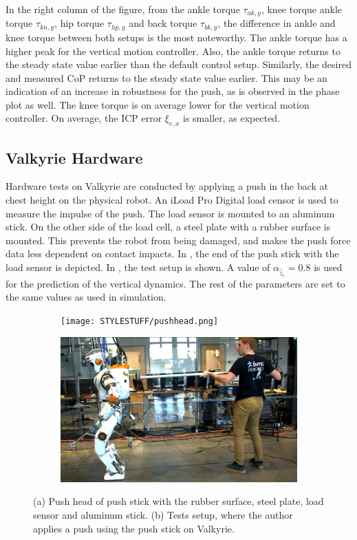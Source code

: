 In the right column of the figure, from the ankle torque $\tau_{ak,y}$, knee torque ankle torque $\tau_{kn,y}$, hip torque $\tau_{hp,y}$ and back torque $\tau_{bk,y}$, the difference in ankle and knee torque between both setups is the most noteworthy. The ankle torque has a higher peak for the vertical motion controller. Also, the ankle torque returns to the steady state value earlier than the default control setup. Similarly, the desired and measured \ac{CoP} returns to the steady state value earlier. This may be an indication of an increase in robustness for the push, as is observed in the phase plot as well. The knee torque is on average lower for the vertical motion controller. On average, the \ac{ICP} error $\xi_{e,x}$ is smaller, as expected.

\subsection{Valkyrie Hardware} 
Hardware tests on Valkyrie are conducted by applying a push in the back at chest height on the physical robot. An iLoad Pro Digital load censor \cite{iload} is used to measure the impulse of the push. The load sensor is mounted to an aluminum stick. On the other side of the load cell, a steel plate with a rubber surface is mounted. This prevents the robot from being damaged, and makes the push force data less dependent on contact impacts. In , the end of the push stick with the load sensor is depicted. In , the test setup is shown. A value of $\alpha_{\hat{\ddot{z}}_{c}}=0.8$ is used for the prediction of the vertical dynamics. The rest of the parameters are set to the same values as used in simulation.
\begin{figure}
\centering
  \begin{subfigure}{0.495\textwidth}
  \centering
  \texttt{[image: STYLESTUFF/pushhead.png]}
   \caption{}
    \label{fig:pushhead}
  \end{subfigure}
  \begin{subfigure}{0.495\textwidth}
    \centering
  \includegraphics[width=.94\linewidth]{STYLESTUFF/authorpush.png}
  \caption{}
   \label{fig:authorpush}
  \end{subfigure}
  \caption{(a) Push head of push stick with the rubber surface, steel plate, load sensor and aluminum stick. (b) Tests setup, where the author applies a push using the push stick on Valkyrie.}
  \label{fig:pushsetup}
\end{figure}

